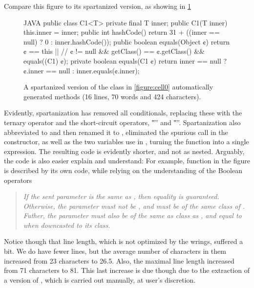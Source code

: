 Compare this figure to its spartanized version, as showing in
\cref{figure:cell1}

\begin{figure}
  \caption{A spartanized version of the \Java class in \cref{figure:cell0}
    automatically generated methods (16 lines, 70 words and 424 characters).}
    \label{figure:cell1}
    \begin{adjustbox}{max width=\columnwidth}
\begin{code}[minipage, width=1.25\columnwidth]{JAVA}
public class C1<T> {
  private final T inner;
  public C1(T inner) {
    this.inner = inner;
  }
  public int hashCode() {
    return 31 + ((inner == null) ? 0 : inner.hashCode());
  }
  public boolean equals(Object ¢) {
    return ¢ == this || //
      ¢ != null && getClass() == ¢.getClass() && equals((C1) ¢);
  }
  private boolean equals(C1 ¢) {
    return inner == null ? ¢.inner == null : inner.equals(¢.inner);
  }
}
\end{code}
\end{adjustbox}
\end{figure}
Evidently, spartanization has removed all conditionals, replacing these with
the ternary operator and the short-circuit operators, ‟\cc{\textbar\textbar}”
and ‟”. Spartanization also abbreviated  to  and then
renamed it to , eliminated the spurious  call in the
constructor, as well as the two variables use in , turning the
function into a single expression.  The resulting code is evidently shorter,
and not as nested. Arguably, the code is also  easier explain and understand:
For example, function  in the figure is described by its
own code, while relying on the understanding of the Boolean operators 
\begin{quote}\itshape\scriptsize
If the sent parameter is the same as , then equality is guaranteed.
Otherwise, the parameter must not be , and must be of the same class
of . Futher, the parameter must also be of the same as class as 
, and equal to  when downcasted to its class.
\end{quote}

Notice though that line length, which is not optimized by the wrings, suffered
a bit.  We do have fewer lines, but the average number of characters in them
increased from 23 characters to 26.5. Also, the maximal line length increased
from 71 characters to 81. This last increase is due though due to the
extraction of a  version of , which is carried
out manually, at user's discretion. 

